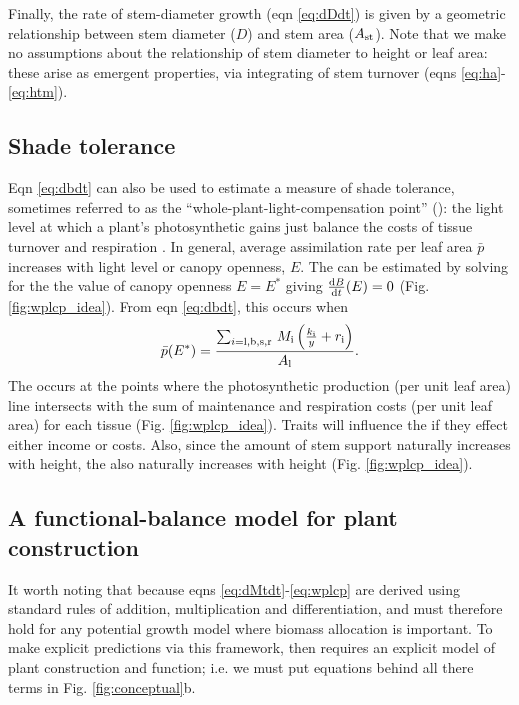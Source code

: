 \documentclass[a4paper,11pt]{article}
\begin{document}
Finally, the rate of stem-diameter growth (eqn \ref{eq:dDdt}) is given by a geometric relationship between stem diameter ($D$) and stem area ($A_{\rm st}$). Note that we make no assumptions about the relationship of stem diameter to height or leaf area: these arise as emergent properties, via integrating of stem turnover (eqns \ref{eq:ha}- \ref{eq:htm}).

\subsection{Shade tolerance}

Eqn \ref{eq:dbdt} can also be used to estimate a measure of shade tolerance, sometimes referred to as the ``whole-plant-light-compensation point'' ({\wplcp}): the light level at which a plant's photosynthetic gains just balance the costs of tissue turnover and respiration \citep{Givnish-1988, Baltzer-2007, Lusk-2013}. In general, average assimilation rate per leaf area $\bar{p}$ increases with light level or canopy openness, $E$. The {\wplcp} can be estimated by solving for the the value of canopy openness $E=E^*$ giving $\frac{{\rm d}B} {{\rm d}t}(E)=0$ (Fig. \ref{fig:wplcp_idea}). From eqn \ref{eq:dbdt}, this occurs when
\begin{equation}\label{eq:wplcp}
\bar{p}(E^*) =\frac{\sum_{i={\rm l,b,s,r}} \, M_{\rm i} \left(\frac{k_{\rm i}}{y} + r_{\rm i}\right)}{A_{\rm l}}.
\end{equation}
The {\wplcp} occurs at the points where the photosynthetic production (per unit leaf area) line intersects with the sum of maintenance and respiration costs (per unit leaf area) for each tissue (Fig. \ref{fig:wplcp_idea}). Traits will influence the {\wplcp} if they effect either income or costs. Also, since the amount of stem support naturally increases with height, the {\wplcp} also naturally increases with height \citep{Givnish-1988} (Fig. \ref{fig:wplcp_idea}).

\subsection{A functional-balance model for plant construction}

It worth noting that because eqns \ref{eq:dMtdt}-\ref{eq:wplcp} are derived using standard rules of addition, multiplication and differentiation, and must therefore hold for any potential growth model where biomass allocation is important. To make explicit predictions via this framework, then requires an explicit model of plant construction and function; i.e. we must put equations behind all there terms in Fig. \ref{fig:conceptual}b.
\end{document}
